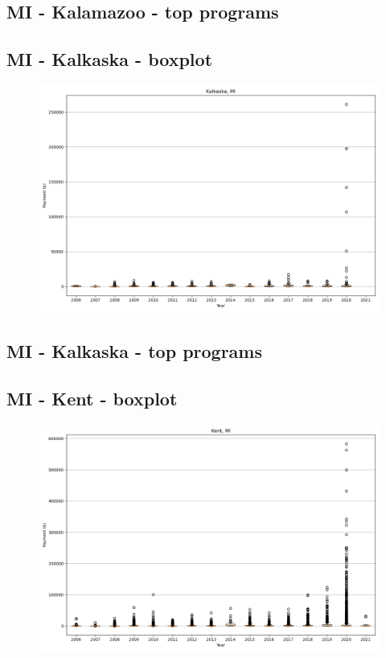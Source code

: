 \subsection*{MI - Kalamazoo - top programs}

\newpage
\subsection*{MI - Kalkaska - boxplot}
\begin{figure}[h]
\centering
\includegraphics[width=7in]{../output/boxplots/counties/Kalkaska-MI_boxplot.png}
\end{figure}


\subsection*{MI - Kalkaska - top programs}

\newpage
\subsection*{MI - Kent - boxplot}
\begin{figure}[h]
\centering
\includegraphics[width=7in]{../output/boxplots/counties/Kent-MI_boxplot.png}
\end{figure}


